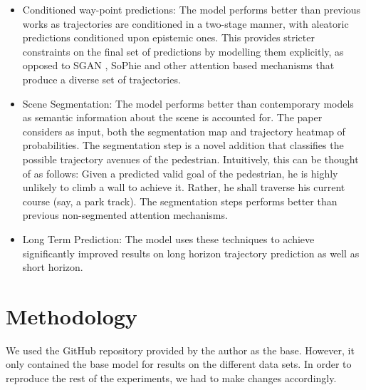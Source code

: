 \begin{itemize}
    \item Conditioned way-point predictions: The model performs better than previous works as trajectories are conditioned in a two-stage manner, with aleatoric predictions conditioned upon epistemic ones. This provides stricter constraints on the final set of predictions by modelling them explicitly, as opposed to SGAN \cite{DBLP:journals/corr/abs-1803-10892}, SoPhie \cite{DBLP:journals/corr/abs-1806-01482} and other attention based mechanisms that produce a diverse set of trajectories.
    
    \item Scene Segmentation: The model performs better than contemporary models as semantic information about the scene is accounted for. The paper considers as input, both the segmentation map and trajectory heatmap of probabilities. The segmentation step is a novel addition that classifies the possible trajectory avenues of the pedestrian. Intuitively, this can be thought of as follows: Given a predicted valid goal of the pedestrian, he is highly unlikely to climb a wall to achieve it. Rather, he shall traverse his current course (say, a park track). The segmentation steps performs better than previous non-segmented attention mechanisms.
    
    \item Long Term Prediction: The model uses these techniques to achieve significantly improved results on long horizon trajectory prediction as well as short horizon.
    
\end{itemize}



\section{Methodology}

We used the GitHub repository provided by the author as the base. However, it only contained the base model for results on the different data sets. In order to reproduce the rest of the experiments, we had to make changes accordingly.

